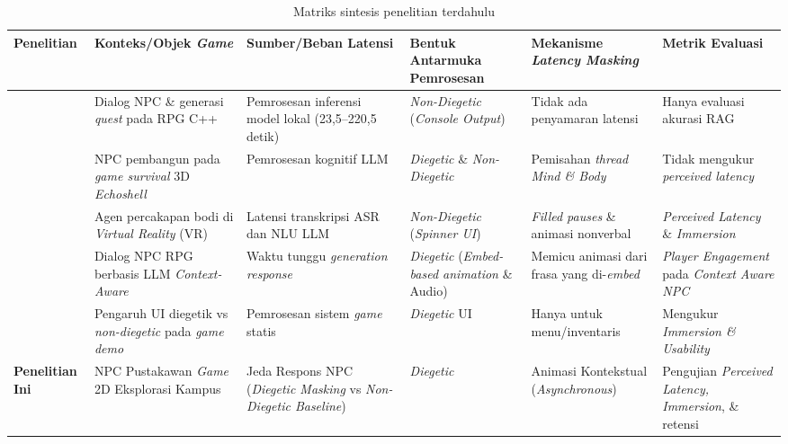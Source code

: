 \begin{table}[H]
    \centering
    \caption{Matriks sintesis penelitian terdahulu}
    \label{tab:sintesis}
    \footnotesize
    \setlength{\tabcolsep}{4pt}
    \begin{tabular}{|p{2.2cm}|p{2.5cm}|p{2.5cm}|p{2.2cm}|p{2.5cm}|p{2.3cm}|}
        \hline
        \textbf{Penelitian} & \textbf{Konteks/Objek \textit{Game}} & \textbf{Sumber/Beban Latensi} & \textbf{Bentuk Antarmuka Pemrosesan} & \textbf{Mekanisme \textit{Latency Masking}} & \textbf{Metrik Evaluasi} \\ \hline

        \citet{siahaan2026retrieval} & Dialog NPC \& generasi \textit{quest} pada RPG C++ & Pemrosesan inferensi model lokal (23,5--220,5 detik) & \textit{Non-Diegetic} (\textit{Console Output}) & Tidak ada penyamaran latensi & Hanya evaluasi akurasi RAG \\ \hline

        \citet{wei2025mind} & NPC pembangun pada \textit{game survival} 3D \textit{Echoshell} & Pemrosesan kognitif LLM & \textit{Diegetic} \& \textit{Non-Diegetic} & Pemisahan \textit{thread Mind \& Body} & Tidak mengukur \textit{perceived latency} \\ \hline

        \citet{elfleet2024investigating} & Agen percakapan bodi di \textit{Virtual Reality} (VR) & Latensi transkripsi ASR dan NLU LLM & \textit{Non-Diegetic} (\textit{Spinner UI}) & \textit{Filled pauses} \& animasi nonverbal & \textit{Perceived Latency} \& \textit{Immersion} \\ \hline
        
        \citet{csepregi2021effect} & Dialog NPC RPG berbasis LLM \textit{Context-Aware} & Waktu tunggu \textit{generation response} & \textit{Diegetic} (\textit{Embed-based animation} \& Audio) & Memicu animasi dari frasa yang di-\textit{embed} & \textit{Player Engagement} pada \textit{Context Aware NPC} \\ \hline

        \citet{andersson2024effects} & Pengaruh UI diegetik vs \textit{non-diegetic} pada \textit{game demo} & Pemrosesan sistem \textit{game} statis & \textit{Diegetic} UI & Hanya untuk menu/inventaris & Mengukur \textit{Immersion \& Usability} \\ \hline

        \textbf{Penelitian Ini} & NPC Pustakawan \textit{Game} 2D Eksplorasi Kampus & Jeda Respons NPC (\textit{Diegetic Masking} vs \textit{Non-Diegetic Baseline}) & \textit{Diegetic} & Animasi Kontekstual (\textit{Asynchronous}) & Pengujian \textit{Perceived Latency, Immersion}, \&  retensi \\ \hline
    \end{tabular}
\end{table}

